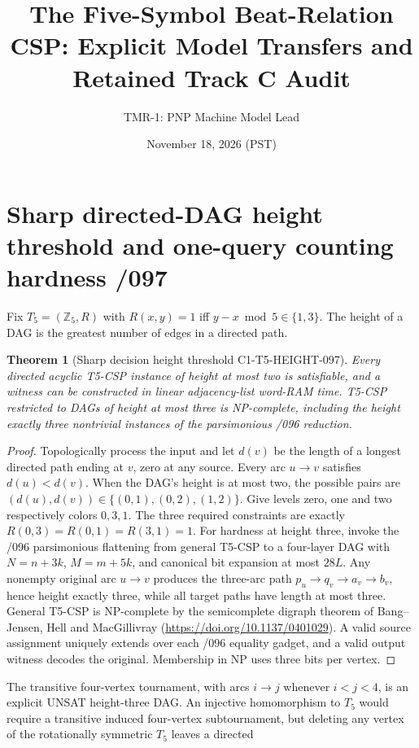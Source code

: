 \documentclass[11pt]{article}
\title{The Five-Symbol Beat-Relation CSP: Explicit Model Transfers and Retained Track C Audit}
\author{TMR-1: PNP Machine Model Lead}
\date{November 18, 2026 (PST)}
\newtheorem{theorem}{Theorem}
\begin{document}
\maketitle


\section{Sharp directed-DAG height threshold and one-query counting hardness /097}
Fix $T_5=(\mathbb Z_5,R)$ with $R(x,y)=1$ iff
$y-x\bmod5\in\{1,3\}$. The height of a DAG is the greatest
number of edges in a directed path.
\begin{theorem}[Sharp decision height threshold C1-T5-HEIGHT-097]
Every directed acyclic T5-CSP instance of height at most two
is satisfiable, and a witness can be constructed in linear
adjacency-list word-RAM time. T5-CSP restricted to DAGs of
height at most three is NP-complete, including the height
exactly three nontrivial instances of the parsimonious /096 reduction.
\end{theorem}
\begin{proof}
Topologically process the input and let $d(v)$ be the length of
a longest directed path ending at $v$, zero at any source.
Every arc $u\to v$ satisfies $d(u)<d(v)$. When the DAG's
height is at most two, the possible pairs are
$(d(u),d(v))\in\{(0,1),(0,2),(1,2)\}$.
Give levels zero, one and two respectively colors $0,3,1$.
The three required constraints are exactly
$R(0,3)=R(0,1)=R(3,1)=1$.
For hardness at height three, invoke the /096 parsimonious
flattening from general T5-CSP to a four-layer DAG with
$N=n+3k$, $M=m+5k$, and canonical bit expansion at most
$28L$. Any nonempty original arc $u\to v$ produces the
three-arc path $p_u\to q_v\to a_v\to b_v$, hence height
exactly three, while all target paths have length at most
three. General T5-CSP is NP-complete by the semicomplete
digraph theorem of Bang--Jensen, Hell and MacGillivray
(\url{https://doi.org/10.1137/0401029}). A valid source
assignment uniquely extends over each /096 equality gadget,
and a valid output witness decodes the original. Membership
in NP uses three bits per vertex.
\end{proof}
The transitive four-vertex tournament, with arcs $i\to j$
whenever $i<j<4$, is an explicit UNSAT height-three DAG.
An injective homomorphism to $T_5$ would require a transitive
induced four-vertex subtournament, but deleting any vertex
of the rotationally symmetric $T_5$ leaves a directed
\end{document}
